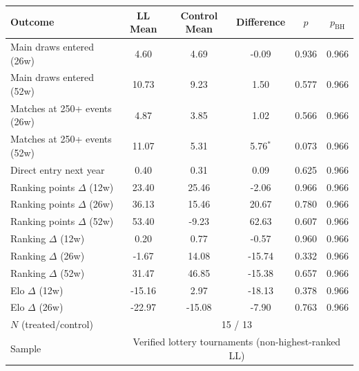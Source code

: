 \begin{tabular}{l ccccc}
\toprule
Outcome & LL Mean & Control Mean & Difference & $p$ & $p_{\text{BH}}$ \\
\midrule
Main draws entered (26w) & 4.60 & 4.69 & -0.09 & 0.936 & 0.966 \\
Main draws entered (52w) & 10.73 & 9.23 & 1.50 & 0.577 & 0.966 \\
Matches at 250+ events (26w) & 4.87 & 3.85 & 1.02 & 0.566 & 0.966 \\
Matches at 250+ events (52w) & 11.07 & 5.31 & 5.76$^{*}$ & 0.073 & 0.966 \\
Direct entry next year & 0.40 & 0.31 & 0.09 & 0.625 & 0.966 \\
Ranking points $\Delta$ (12w) & 23.40 & 25.46 & -2.06 & 0.966 & 0.966 \\
Ranking points $\Delta$ (26w) & 36.13 & 15.46 & 20.67 & 0.780 & 0.966 \\
Ranking points $\Delta$ (52w) & 53.40 & -9.23 & 62.63 & 0.607 & 0.966 \\
Ranking $\Delta$ (12w) & 0.20 & 0.77 & -0.57 & 0.960 & 0.966 \\
Ranking $\Delta$ (26w) & -1.67 & 14.08 & -15.74 & 0.332 & 0.966 \\
Ranking $\Delta$ (52w) & 31.47 & 46.85 & -15.38 & 0.657 & 0.966 \\
Elo $\Delta$ (12w) & -15.16 & 2.97 & -18.13 & 0.378 & 0.966 \\
Elo $\Delta$ (26w) & -22.97 & -15.08 & -7.90 & 0.763 & 0.966 \\
\midrule
$N$ (treated/control) & \multicolumn{5}{c}{15 / 13} \\
Sample & \multicolumn{5}{c}{Verified lottery tournaments (non-highest-ranked LL)} \\
\bottomrule
\end{tabular}
